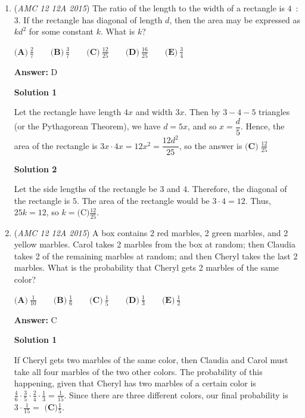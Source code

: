 \begin{enumerate}
	\item (\textit{AMC 12 12A 2015}) The ratio of the length to the width of a rectangle is $4$ : $3$. If the rectangle has diagonal of length $d$, then the area may be expressed as $kd^2$ for some constant $k$. What is $k$?


 $\textbf{(A)}\ \frac27 \qquad\textbf{(B)}\ \frac37 \qquad\textbf{(C)}\ \frac{12}{25} \qquad\textbf{(D)}\ \frac{16}{25} \qquad\textbf{(E)}\ \frac34$

 \textbf{Answer: }D



\textbf{Solution 1}

Let the rectangle have length $4x$ and width $3x$. Then by $3-4-5$ triangles (or the Pythagorean Theorem), we have $d = 5x$, and so $x = \dfrac{d}{5}$. Hence, the area of the rectangle is $3x \cdot 4x = 12x^2 = \dfrac{12d^2}{25}$, so the answer is $\boxed{\textbf{(C)}\;\frac{12}{25}}$




\textbf{Solution 2}

Let the side lengths of the rectangle be $3$ and $4$. Therefore, the diagonal of the rectangle is $5$. The area of the rectangle would be $3\cdot{4}=12.$ Thus, $25k=12$, so $k=\boxed{\text{(C)} \frac{12}{25}}.$



	\item (\textit{AMC 12 12A 2015}) A box contains 2 red marbles, 2 green marbles, and 2 yellow marbles. Carol takes 2 marbles from the box at random; then Claudia takes 2 of the remaining marbles at random; and then Cheryl takes the last 2 marbles. What is the probability that Cheryl gets 2 marbles of the same color?


 $\textbf{(A)}\ \frac{1}{10} \qquad\textbf{(B)}\ \frac16 \qquad\textbf{(C)}\ \frac15 \qquad\textbf{(D)}\ \frac13 \qquad\textbf{(E)}\ \frac12$

 \textbf{Answer: }C



\textbf{Solution 1}

If Cheryl gets two marbles of the same color, then Claudia and Carol must take all four marbles of the two other colors. The probability of this happening, given that Cheryl has two marbles of a certain color is $\frac{4}{6} \cdot \frac{3}{5} \cdot \frac{2}{4} \cdot \frac{1}{3} = \frac{1}{15}$. Since there are three different colors, our final probability is $3 \cdot \frac{1}{15} = \textbf{ (C)} \frac{1}{5}$.

 




\end{enumerate}
